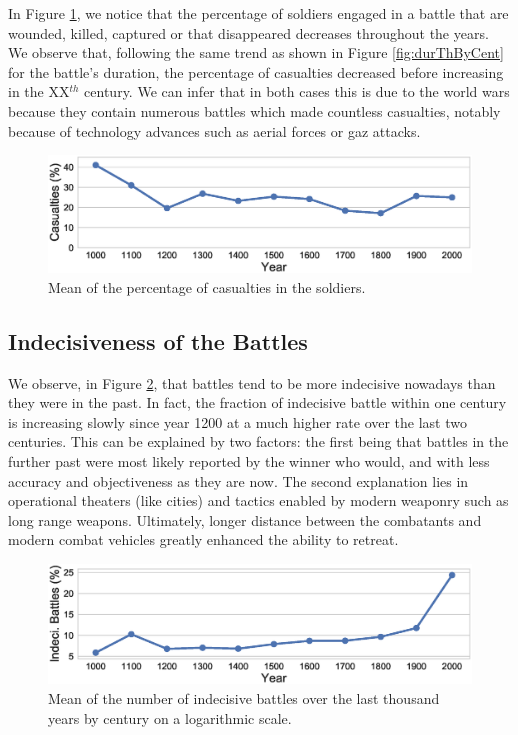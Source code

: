In Figure \ref{fig:casuPerCent}, we notice that the percentage of soldiers engaged in a battle that are wounded, killed, captured or that disappeared decreases throughout the years. We observe that, following the same trend as shown in Figure \ref{fig:durThByCent} for the battle's duration, the percentage of casualties decreased before increasing in the XX$^{th}$ century. We can infer that in both cases this is due to the world wars because they contain numerous battles which made countless casualties, notably because of technology advances such as aerial forces or gaz attacks.
 \begin{figure}[h]
	\centering	\includegraphics[width=\linewidth]{figures/casuPerCent}
	\caption{Mean of the percentage of casualties in the soldiers.}\label{fig:casuPerCent}
	\centering
\end{figure}

\subsection{Indecisiveness of the Battles}

We observe, in Figure \ref{fig:IndecBattles}, that battles tend to be more indecisive nowadays than they were in the past. In fact, the fraction of indecisive battle within one century is increasing slowly since year 1200 at a much higher rate over the last two centuries. This can be explained by two factors: the first being that battles in the further past were most likely reported by the winner who would, and with less accuracy and objectiveness as they are now. The second explanation lies in operational theaters (like cities) and tactics enabled by modern weaponry such as long range weapons. Ultimately, longer distance between the combatants and modern combat vehicles greatly enhanced the ability to retreat.

 \begin{figure}[h]
	\centering	\includegraphics[width=\linewidth]{figures/indThByCent}
	\caption{Mean of the number of indecisive battles over the last thousand years by century on a logarithmic scale.}\label{fig:IndecBattles}
	\centering
\end{figure}

